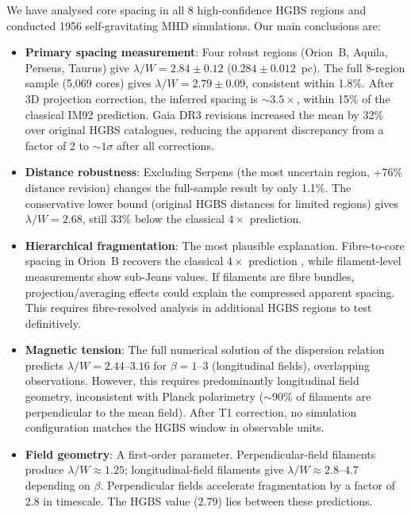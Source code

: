 \documentclass[twoside,twocolumn]{mnras}
\begin{document}
We have analysed core spacing in all 8 high-confidence HGBS regions and conducted
1956 self-gravitating MHD simulations. Our main conclusions are:

\begin{itemize}

    \item \textbf{Primary spacing measurement}: Four robust regions (Orion~B, Aquila,
    Perseus, Taurus) give $\lambda/W = 2.84 \pm 0.12$ ($0.284 \pm 0.012$~pc). The
    full 8-region sample (5,069 cores) gives $\lambda/W = 2.79 \pm 0.09$, consistent
    within 1.8\%. After 3D projection correction, the inferred spacing is ${\sim}3.5\times$,
    within 15\% of the classical IM92 prediction. Gaia DR3 revisions increased the mean
    by 32\% over original HGBS catalogues, reducing the apparent discrepancy from a
    factor of 2 to ${\sim}1\sigma$ after all corrections.

    \item \textbf{Distance robustness}: Excluding Serpens (the most uncertain region,
    +76\% distance revision) changes the full-sample result by only 1.1\%.
    The conservative lower bound (original HGBS distances for limited regions) gives
    $\lambda/W = 2.68$, still 33\% below the classical $4\times$ prediction.

    \item \textbf{Hierarchical fragmentation}: The most plausible explanation.
    Fibre-to-core spacing in Orion~B recovers the classical $4\times$ prediction
    \citep{Yang2024}, while filament-level measurements show sub-Jeans values.
    If filaments are fibre bundles, projection/averaging effects could explain the
    compressed apparent spacing. This requires fibre-resolved analysis in additional
    HGBS regions to test definitively.

    \item \textbf{Magnetic tension}: The full numerical solution of the dispersion
    relation predicts $\lambda/W = 2.44$--$3.16$ for $\beta = 1$--$3$ (longitudinal
    fields), overlapping observations. However, this requires predominantly longitudinal
    field geometry, inconsistent with Planck polarimetry ($\sim$90\% of filaments
    are perpendicular to the mean field). After T1 correction, no simulation
    configuration matches the HGBS window in observable units.

    \item \textbf{Field geometry}: A first-order parameter. Perpendicular-field
    filaments produce $\lambda/W \approx 1.25$; longitudinal-field filaments give
    $\lambda/W \approx 2.8$--$4.7$ depending on $\beta$. Perpendicular fields accelerate
    fragmentation by a factor of 2.8 in timescale. The HGBS value ($2.79$) lies between
    these predictions.


\end{itemize}
\end{document}
